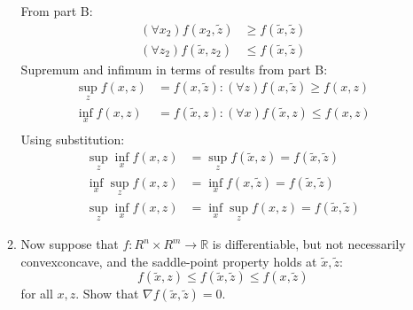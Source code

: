 \documentclass[12pt,letter]{article}
\newcommand{\R}{\mathbb{R}}
\begin{document}
\begin{enumerate}
\begin{enumerate}
    From part B:
    \begin{align*}
      (\forall x_2) f(x_2,\tilde{z}) & \geq f(\tilde{x},\tilde{z})\\
      (\forall z_2) f(\tilde{x},z_2) & \leq f(\tilde{x},\tilde{z})
    \end{align*}
    Supremum and infimum in terms of results from part B:
    \begin{align*}
      \sup_z f(x,z) &= f(x,\tilde{z}) : (\forall z) f(x,\tilde{z}) \geq f(x,z)\\
      \inf_x f(x,z) &= f(\tilde{x},z) : (\forall x) f(\tilde{x},z) \leq f(x,z)\\
    \end{align*}
    Using substitution:
    \begin{align*}
      \sup_z  \inf_x f(x,z) &= \sup_z f(\tilde{x},z) = f(\tilde{x},\tilde{z})\\
      \inf_x \sup_z f(x,z) &= \inf_x f(x,\tilde{z}) = f(\tilde{x},\tilde{z})\\
      \sup_z  \inf_x f(x,z) &= \inf_x \sup_z f(x,z) = f(\tilde{x},\tilde{z})
    \end{align*}
    
  \item Now suppose that $f: R^n \times R^m \to \R$ is differentiable, but not necessarily convexconcave, and the saddle-point property holds at $\tilde{x}, \tilde{z}$: \[f(\tilde{x}, z) \leq f(\tilde{x}, \tilde{z}) \leq  f(x, \tilde{z})\] for all $x, z$. Show that $\nabla f(\tilde{x}, \tilde{z}) = 0$.


\end{enumerate}
\end{enumerate}
\end{document}
